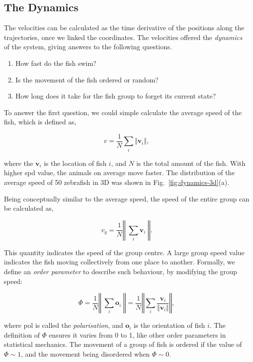 \documentclass[11pt,twoside]{report}
\begin{document}
\subsection{The Dynamics}

The velocities can be calculated as the time derivative of the positions along the trajectories, once we linked the coordinates. The velocities offered the \emph{dynamics} of the system, giving answers to the following questions.

\begin{enumerate}
	\item How fast do the fish swim?
	\item Is the movement of the fish ordered or random?
	\item How long does it take for the fish group to forget its current state?
\end{enumerate}

To answer the first question, we could simple calculate the average speed of the fish, which is defined as,

\begin{equation}
	v = \frac1N \sum_i{\left\Vert \mathbf{v}_i \right\Vert},
\label{eq:speed}
\end{equation}

\noindent where the $\mathbf{v}_i$ is the location of fish $i$, and $N$ is the total amount of the fish. With higher \gls{spd} value, the animals on average move faster.
The distribution of the average speed of 50 zebrafish in 3D was shown in Fig.~\ref{fig:dynamics-3d}(a).

Being conceptually similar to the average speed, the speed of the entire group can be calculated as,

$$
v_g = \frac1N \left\Vert
\; \sum_i{\mathbf{v}_i} \;
\right\Vert.
$$

\noindent This quantity indicates the speed of the group centre. A large group speed value indicates the fish  moving collectively from one place to another. Formally, we define an \emph{order parameter} to describe such behaviour, by modifying the group speed:

\begin{equation}
	\Phi = \frac1N \left\Vert
		\; \sum_i \mathbf{o}_i \;
	\right\Vert
	= \frac1N \left\Vert
		\sum_i \frac{\mathbf{v}_i}{\Vert \mathbf{v}_i \Vert}
	\right\Vert,
\label{eq:polarisation}
\end{equation}

\noindent where \gls{pol} is called the \emph{polarisation}, and $\mathbf{o}_i$ is the orientation of fish $i$. The definition of $\Phi$ ensures it varies from 0 to 1, like other order parameters in statistical mechanics.
The movement of a group of fish is ordered if the value of $\Phi \sim 1$, and the movement being disordered when $\Phi \sim 0$.
\end{document}
